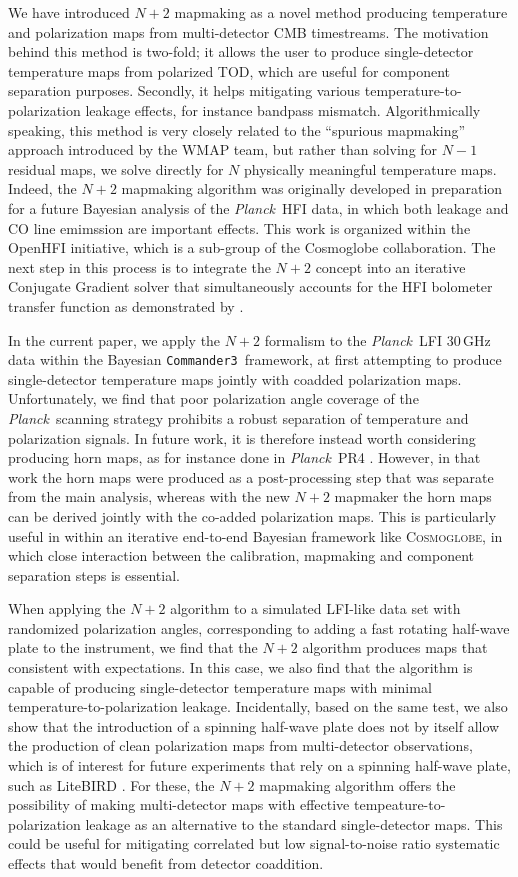 \documentclass{aa}
\def\commanderthree{\texttt{Commander3}}
\newcommand{\Cosmoglobe}{\textsc{Cosmoglobe}}
\def\Cosmoglobe{\textsc{Cosmoglobe}}
\def\Planck{\textit{Planck}}
\begin{document}
We have introduced $N+2$ mapmaking as a novel method producing temperature and polarization maps from multi-detector CMB timestreams. The motivation behind this method is two-fold; it allows the user to produce single-detector temperature maps from polarized TOD, which are useful for component separation purposes. Secondly, it helps mitigating various temperature-to-polarization leakage effects, for instance bandpass mismatch. Algorithmically speaking, this method is very closely related to the ``spurious mapmaking'' approach introduced by the WMAP team, but rather than solving for $N-1$ residual maps, we solve directly for $N$ physically meaningful temperature maps. Indeed, the $N+2$ mapmaking algorithm was originally developed in preparation for a future Bayesian analysis of the \Planck\ HFI data, in which both leakage and CO line emimssion are important effects. This work is organized within the OpenHFI initiative, which is a sub-group of the Cosmoglobe collaboration. The next step in this process is to integrate the $N+2$ concept into an iterative Conjugate Gradient solver that simultaneously accounts for the HFI bolometer transfer function as demonstrated by \cite{artem}. 

In the current paper, we apply the $N+2$ formalism to the \Planck\ LFI 30\,GHz data within the Bayesian \commanderthree\ framework, at first attempting to produce single-detector temperature maps jointly with coadded polarization maps. Unfortunately, we find that poor polarization angle coverage of the \Planck\ scanning strategy prohibits a robust separation of temperature and polarization signals. In future work, it is therefore instead worth considering producing horn maps, as for instance done in \Planck\ PR4 \citep{npipe}. However, in that work the horn maps were produced as a post-processing step that was separate from the main analysis, whereas with the new $N+2$ mapmaker the horn maps can be derived jointly with the co-added polarization maps. This is particularly useful in within an iterative end-to-end Bayesian framework like \Cosmoglobe, in which close interaction between the calibration, mapmaking and component separation steps is essential.    

When applying the $N+2$ algorithm to a simulated LFI-like data set with randomized polarization angles, corresponding to adding a fast rotating half-wave plate to the instrument, we find that the $N+2$ algorithm produces maps that consistent with expectations. In this case, we also find that the algorithm is capable of producing single-detector temperature maps with minimal temperature-to-polarization leakage. Incidentally, based on the same test, we also show that the introduction of a spinning half-wave plate does not by itself allow the production of clean polarization maps from multi-detector observations, which is of interest for future experiments that rely on a spinning half-wave plate, such as LiteBIRD \citep{litebird2022}. For these, the $N+2$ mapmaking algorithm offers the possibility of making multi-detector maps with effective tempeature-to-polarization leakage as an alternative to the standard single-detector maps. This could be useful for mitigating correlated but low signal-to-noise ratio systematic effects that would benefit from detector coaddition. 
\end{document}
